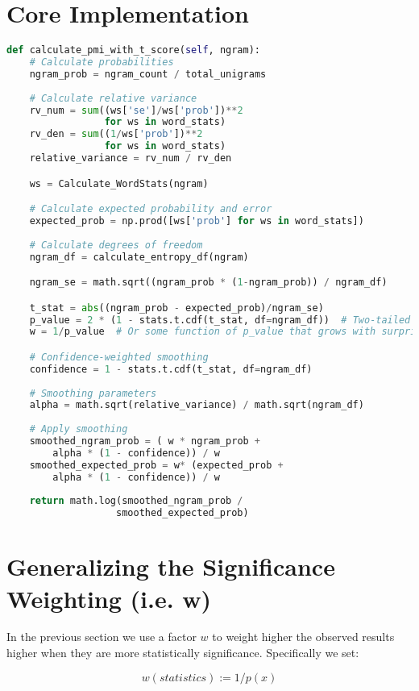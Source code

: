 \documentclass[12pt,a4paper]{article}
\begin{document}
\section{Core Implementation}
\begin{lstlisting}[language=Python]
def calculate_pmi_with_t_score(self, ngram):
    # Calculate probabilities
    ngram_prob = ngram_count / total_unigrams
    
    # Calculate relative variance
    rv_num = sum((ws['se']/ws['prob'])**2 
                 for ws in word_stats)
    rv_den = sum((1/ws['prob'])**2 
                 for ws in word_stats)
    relative_variance = rv_num / rv_den

    ws = Calculate_WordStats(ngram)

    # Calculate expected probability and error
    expected_prob = np.prod([ws['prob'] for ws in word_stats])
    
    # Calculate degrees of freedom
    ngram_df = calculate_entropy_df(ngram)

    ngram_se = math.sqrt((ngram_prob * (1-ngram_prob)) / ngram_df)

    t_stat = abs((ngram_prob - expected_prob)/ngram_se)
    p_value = 2 * (1 - stats.t.cdf(t_stat, df=ngram_df))  # Two-tailed test
    w = 1/p_value  # Or some function of p_value that grows with surprise

    # Confidence-weighted smoothing
    confidence = 1 - stats.t.cdf(t_stat, df=ngram_df) 
    
    # Smoothing parameters
    alpha = math.sqrt(relative_variance) / math.sqrt(ngram_df)
    
    # Apply smoothing
    smoothed_ngram_prob = ( w * ngram_prob + 
        alpha * (1 - confidence)) / w
    smoothed_expected_prob = w* (expected_prob + 
        alpha * (1 - confidence)) / w
    
    return math.log(smoothed_ngram_prob / 
                   smoothed_expected_prob)
\end{lstlisting}

\section{Generalizing the Significance Weighting (i.e. w)}

In the previous section we use a factor $w$ to weight higher the observed results higher when they are more statistically significance. Specifically we set:

\begin{equation}
   w(statistics):=1/p(x)
\end{equation}
\end{document}
